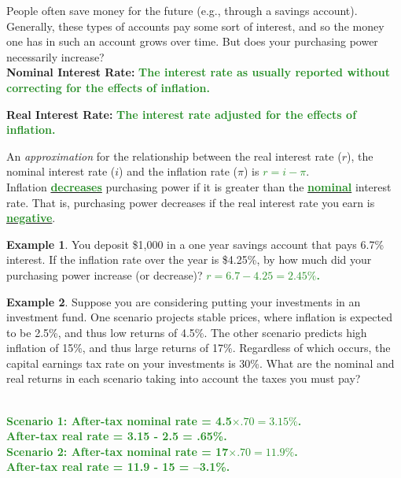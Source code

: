 \documentclass[11pt]{article}\usepackage[]{graphicx}\usepackage[]{color}
\theoremstyle{definition}
\newtheorem{exmp}{Example}[section]
\newcommand{\ddp}[1]{{\textbf{\textcolor{ForestGreen}{#1}}}}
\newcommand{\dd}[1]{{\underline{\textbf{\textcolor{ForestGreen}{#1}}}}}
\newcommand{\defn}[1]{\textbf{#1}}
\begin{document}
People often save money for the future (e.g., through a savings account). Generally, these types of accounts pay some sort of interest, and so the money one has in such an account grows over time. But does your purchasing power necessarily increase?
\\

\defn{Nominal Interest Rate:} \ddp{The interest rate as usually reported without correcting for the effects of inflation.\\}

\defn{Real Interest Rate:} \ddp{The interest rate adjusted for the effects of inflation.\\}

An \textit{approximation} for the relationship between the real interest rate ($r$), the nominal interest rate ($i$) and the inflation rate ($\pi$) is \dd{$r = i - \pi$}.
\\

Inflation \dd{decreases} purchasing power if it is greater than the \dd{nominal} interest rate. That is, purchasing power decreases if the real interest rate you earn is \dd{negative}.


\begin{exmp} You deposit \$1,000 in a one year savings account that pays 6.7\% interest. If the inflation rate over the year is \$4.25\%, by how much did your purchasing power increase (or decrease)?
	\ddp{$r = 6.7 - 4.25 = 2.45\%$.}
\end{exmp}

\begin{exmp} 
	Suppose you are considering putting your investments in an investment fund. One scenario projects stable prices, where inflation is expected to be 2.5\%, and thus low returns of 4.5\%. The other scenario predicts high inflation of 15\%, and thus large returns of 17\%. Regardless of which occurs, the capital earnings tax rate on your investments is 30\%. What are the nominal and real returns in each scenario taking into account the taxes you must pay? 
	
	\ddp{\\ Scenario 1: After-tax nominal rate = 4.5$\times .70 = 3.15\%$. \\
		After-tax real rate = 3.15 - 2.5 = .65\%. \\
		Scenario 2: After-tax nominal rate = 17$\times .70 = 11.9\%$. \\
		After-tax real rate = 11.9 - 15 = --3.1\%. }
\end{exmp}
\newpage
\end{document}
